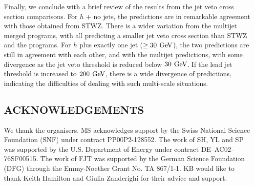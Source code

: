 Finally, we conclude with a brief review of the results from the jet veto 
cross section comparisons. For $h$ + no jets, the \NNLOPS predictions are 
in remarkable agreement with those obtained from STWZ. There is a wider 
variation from the multijet merged programs, with all predicting a smaller 
jet veto cross section than STWZ and the \NNLOPS programs. For $h$ plus 
exactly one jet ($\ge 30\,\text{\:GeV}$), the two \NNLOPS predictions are still in 
agreement with each other, and with the multijet predictions, with some 
divergence as the jet veto threshold is reduced below $30 \,\text{\:GeV}$. If the 
lead jet threshold is increased to $200\,\text{\:GeV}$, there is a wide divergence 
of predictions, indicating the difficulties of dealing with such multi-scale 
situations. 


\subsection*{ACKNOWLEDGEMENTS}

We thank the organisers.
MS acknowledges support by the Swiss National Science Foundation (SNF) 
under contract PP00P2-128552. 
The work of SH, YL and SP was supported by the U.S. Department of Energy 
under contract DE--AC02--76SF00515.
The work of FJT was supported by the German Science Foundation (DFG) 
through the Emmy-Noether Grant No. TA 867/1-1. 
KB would like to thank Keith Hamilton and Giulia Zanderighi for their 
advice and support.